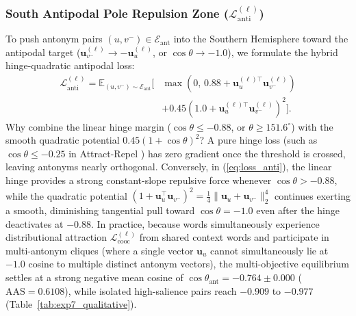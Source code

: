 \documentclass[journal]{IEEEtran}
\begin{document}
\subsubsection{South Antipodal Pole Repulsion Zone ($\mathcal{L}_{\text{anti}}^{(\ell)}$)}
To push antonym pairs $(u, v^-) \in \mathcal{E}_{\text{ant}}$ into the Southern Hemisphere toward the antipodal target ($\mathbf{u}_{v^-}^{(\ell)} \to -\mathbf{u}_u^{(\ell)}$, or $\cos\theta \to -1.0$), we formulate the hybrid hinge-quadratic antipodal loss:
\begin{equation}
\begin{aligned}
\mathcal{L}_{\text{anti}}^{(\ell)} = \mathbb{E}_{(u,v^-)\sim\mathcal{E}_{\text{ant}}}\Big[ &\max\!\left(0, \, 0.88 + \mathbf{u}_u^{(\ell)\top}\mathbf{u}_{v^-}^{(\ell)}\right) \\
&+ 0.45\left(1.0 + \mathbf{u}_u^{(\ell)\top}\mathbf{u}_{v^-}^{(\ell)}\right)^2 \Big].
\end{aligned}
\label{eq:loss_anti}
\end{equation}
Why combine the linear hinge margin ($\cos\theta \le -0.88$, or $\theta \ge 151.6^\circ$) with the smooth quadratic potential $0.45(1 + \cos\theta)^2$? A pure hinge loss (such as $\cos\theta \le -0.25$ in Attract-Repel \cite{mrksic2017semantic}) has zero gradient once the threshold is crossed, leaving antonyms nearly orthogonal. Conversely, in (\ref{eq:loss_anti}), the linear hinge provides a strong constant-slope repulsive force whenever $\cos\theta > -0.88$, while the quadratic potential $(1 + \mathbf{u}_u^\top \mathbf{u}_{v^-})^2 = \frac{1}{4}\|\mathbf{u}_u + \mathbf{u}_{v^-}\|_2^4$ continues exerting a smooth, diminishing tangential pull toward $\cos\theta = -1.0$ even after the hinge deactivates at $-0.88$. In practice, because words simultaneously experience distributional attraction $\mathcal{L}_{\text{cooc}}^{(\ell)}$ from shared context words and participate in multi-antonym cliques (where a single vector $\mathbf{u}_u$ cannot simultaneously lie at $-1.0$ cosine to multiple distinct antonym vectors), the multi-objective equilibrium settles at a strong negative mean cosine of $\cos\theta_{\text{ant}} = -0.764 \pm 0.000$ ($\text{AAS} = 0.6108$), while isolated high-salience pairs reach $-0.909$ to $-0.977$ (Table~\ref{tab:exp7_qualitative}).
\end{document}
